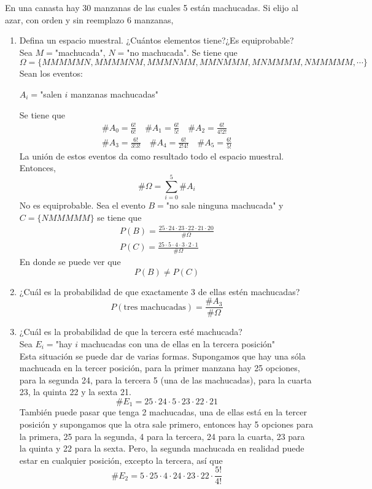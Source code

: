 \item En una canasta hay 30 manzanas de las cuales 5 están machucadas. Si elijo al azar, con orden y sin reemplazo 6 manzanas,
    \begin{enumerate}
        \item Defina un espacio muestral. ¿Cuántos elementos tiene?¿Es equiprobable?\e\\
            Sea $M=$"machucada", $N=$"no machucada". Se tiene que\[\Omega=\{MMMMMN,MMMMNM,MMMNMM,MMNMMM,MNMMMM,NMMMMM,\cdots\}\]
            Sean los eventos:\begin{center}
                $A_i=$"salen $i$ manzanas machucadas"
            \end{center}
            Se tiene que \begin{align*}
                \#A_0=\frac{6!}{6!}\quad\#A_1=\frac{6!}{5!}\quad\#A_2=\frac{6!}{4!2!}\\
                \#A_3=\frac{6!}{3!3!}\quad\#A_4=\frac{6!}{2!4!}\quad\#A_5=\frac{6!}{5!}
            \end{align*}
            La unión de estos eventos da como resultado todo el espacio muestral. Entonces,\[\#\Omega=\sum\limits_{i=0}^5\#A_i\]
            No es equiprobable. Sea el evento $B=$"no sale ninguna machucada" y $C=\{NMMMMM\}$ se tiene que \begin{align*}
                P(B)=\frac{25\cdot24\cdot23\cdot22\cdot21\cdot20}{\#\Omega}\\
                P(C)=\frac{25\cdot5\cdot4\cdot3\cdot2\cdot1}{\#\Omega}
            \end{align*}
            En donde se puede ver que\[P(B)\neq P(C)\]
        \item ¿Cuál es la probabilidad de que exactamente 3 de ellas estén machucadas?
            \[P(\text{tres machucadas})=\frac{\#A_3}{\#\Omega}\]
        \item ¿Cuál es la probabilidad de que la tercera esté machucada?\e\\
            Sea $E_i=$"hay $i$ machucadas con una de ellas en la tercera posición"\\
            Esta situación se puede dar de varias formas. Supongamos que hay una sóla machucada en la tercer posición, para la primer manzana hay 25 opciones, para la segunda 24, para la tercera 5 (una de las machucadas), para la cuarta 23, la quinta 22 y la sexta 21.\[\#E_1=25\cdot24\cdot5\cdot23\cdot22\cdot21\]
            También puede pasar que tenga 2 machucadas, una de ellas está en la tercer posición y supongamos que la otra sale primero, entonces hay 5 opciones para la primera, 25 para la segunda, 4 para la tercera, 24 para la cuarta, 23 para la quinta y 22 para la sexta. Pero, la segunda machucada en realidad puede estar en cualquier posición, excepto la tercera, así que \[\#E_2=5\cdot25\cdot4\cdot24\cdot23\cdot22\cdot\frac{5!}{4!}\]

\end{enumerate}
